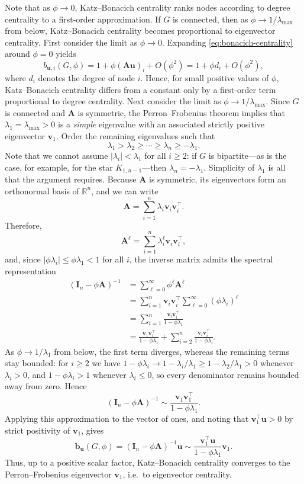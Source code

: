 Note that as $\phi \to 0$, Katz--Bonacich centrality ranks nodes according to
degree centrality to a first-order approximation. If $G$ is connected, then as
$\phi \to 1/\lambda_{\max}$ from below, Katz--Bonacich centrality becomes
proportional to eigenvector centrality. First consider the limit as
$\phi \to 0$. Expanding \eqref{eq:bonacich-centrality} around $\phi=0$ yields
\[
b_{\mathbf u,i}(G,\phi)
=
1+\phi(\mathbf A\mathbf u)_i+ O(\phi^2)
=
1+\phi d_i+ O(\phi^2),
\]
where $d_i$ denotes the degree of node $i$. Hence, for small positive values of
$\phi$, Katz--Bonacich centrality differs from a constant only by a first-order
term proportional to degree centrality. Next consider the limit as
$\phi \to 1/\lambda_{\max}$. Since $G$ is connected and $\mathbf A$ is
symmetric, the Perron--Frobenius theorem implies that
$\lambda_1=\lambda_{\max}>0$ is a \emph{simple} eigenvalue with an associated
strictly positive eigenvector $\mathbf v_1$. Order the remaining eigenvalues
such that
\[
\lambda_1 > \lambda_2 \geq \cdots \geq \lambda_n \geq -\lambda_1 .
\]
Note that we cannot assume $|\lambda_i|<\lambda_1$ for all $i \geq 2$: if $G$
is bipartite---as is the case, for example, for the star $K_{1,n-1}$---then
$\lambda_n=-\lambda_1$. Simplicity of $\lambda_1$ is all that the argument
requires. Because $\mathbf A$ is symmetric, its eigenvectors form an
orthonormal basis of $\mathbb R^n$, and we can write
\begin{equation}
\mathbf A
=
\sum_{i=1}^n \lambda_i \mathbf v_i \mathbf v_i^\top .
\label{eq:spectral-sum}
\end{equation}
Therefore,
\[
\mathbf A^\ell
=
\sum_{i=1}^n \lambda_i^\ell \mathbf v_i \mathbf v_i^\top ,
\]
and, since $|\phi\lambda_i| \leq \phi\lambda_1 < 1$ for all $i$, the inverse
matrix admits the spectral representation
\begin{align*}
(\mathbf I_n-\phi \mathbf A)^{-1}
&=
\sum_{\ell=0}^{\infty} \phi^\ell \mathbf A^\ell  \\
&=
\sum_{i=1}^n
\mathbf v_i \mathbf v_i^\top
\sum_{\ell=0}^{\infty}(\phi\lambda_i)^\ell \\
&=
\sum_{i=1}^n
\frac{\mathbf v_i \mathbf v_i^\top}{1-\phi\lambda_i} \\
&=
\frac{\mathbf v_1 \mathbf v_1^\top}{1-\phi\lambda_1}
+
\sum_{i=2}^n
\frac{\mathbf v_i \mathbf v_i^\top}{1-\phi\lambda_i}.
\end{align*}
As $\phi \to 1/\lambda_1$ from below, the first term diverges, whereas the
remaining terms stay bounded: for $i \geq 2$ we have
$1-\phi\lambda_i \to 1-\lambda_i/\lambda_1 \geq 1-\lambda_2/\lambda_1 > 0$
whenever $\lambda_i>0$, and $1-\phi\lambda_i > 1$ whenever $\lambda_i \leq 0$,
so every denominator remains bounded away from zero. Hence
\[
(\mathbf I_n-\phi \mathbf A)^{-1}
\sim
\frac{\mathbf v_1 \mathbf v_1^\top}{1-\phi\lambda_1}.
\]
Applying this approximation to the vector of ones, and noting that
$\mathbf v_1^\top\mathbf u>0$ by strict positivity of $\mathbf v_1$, gives
\[
\mathbf b_{\mathbf u}(G,\phi)
=
(\mathbf I_n-\phi\mathbf A)^{-1}\mathbf u
\sim
\frac{\mathbf v_1^\top \mathbf u}{1-\phi\lambda_1}\mathbf v_1 .
\]
Thus, up to a positive scalar factor, Katz--Bonacich centrality converges to the
Perron--Frobenius eigenvector $\mathbf v_1$, i.e.\ to eigenvector centrality.

